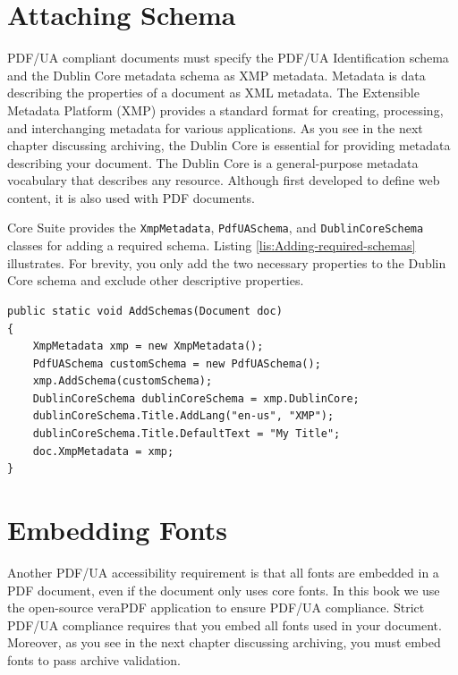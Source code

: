 \documentclass[american]{tufte-book}
\numberwithin{equation}{section}
\numberwithin{figure}{section}
\begin{document}
{{\section{Attaching Schema}

PDF/UA compliant documents must specify the PDF/UA Identification
schema and the Dublin Core metadata schema as XMP metadata. Metadata is data describing the properties of a document as XML metadata.
The Extensible Metadata Platform (XMP) provides a standard format
for creating, processing, and interchanging metadata for various applications.
As you see in the next chapter discussing archiving, the Dublin Core
is essential for providing metadata describing your document. The
Dublin Core is a general-purpose metadata vocabulary that describes
any resource. Although first developed to define web content,
it is also used with PDF documents.

Core Suite provides the \texttt{XmpMetadata}, \texttt{PdfUASchema},
and \texttt{DublinCoreSchema} classes for adding a required schema. Listing \ref{lis:Adding-required-schemas} illustrates.
For brevity, you only add the two necessary properties to the Dublin
Core schema and exclude other descriptive properties.

\bgroup{}
\begin{lstlisting}[caption={Adding required schema to a PDF.},label={lis:Adding-required-schemas},basicstyle={\footnotesize\ttfamily},breaklines=true]
public static void AddSchemas(Document doc)
{
    XmpMetadata xmp = new XmpMetadata();
    PdfUASchema customSchema = new PdfUASchema();
    xmp.AddSchema(customSchema);
    DublinCoreSchema dublinCoreSchema = xmp.DublinCore;
    dublinCoreSchema.Title.AddLang("en-us", "XMP");
    dublinCoreSchema.Title.DefaultText = "My Title";
    doc.XmpMetadata = xmp; 
}
\end{lstlisting}
\leavevmode\egroup


\section{Embedding Fonts}\label{sec:Embedding-Fonts}

Another PDF/UA accessibility requirement is that all fonts are embedded
in a PDF document, even if the document only uses core fonts. In this book we use the open-source veraPDF application to ensure
PDF/UA compliance. Strict PDF/UA compliance requires that you embed
all fonts used in your document. Moreover, as you see in the next
chapter discussing archiving, you must embed fonts to pass archive
validation.

}}
\end{document}
